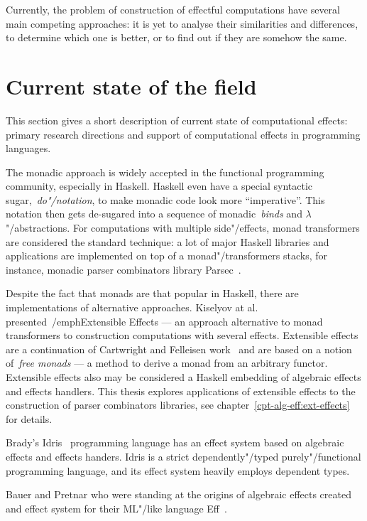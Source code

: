 Currently, the problem of construction of effectful computations have several
main competing approaches: it is yet to analyse their similarities and differences,
to determine which one is better, or to find out if they are somehow the same.

\section{Current state of the field}

This section gives a short description of current state of computational effects:
primary research directions and support of computational effects in programming
languages.

The monadic approach is widely accepted in the functional programming community,
especially in Haskell. Haskell even have a special syntactic sugar,~\emph{do"/notation}, to
make monadic code look more ``imperative''. This notation then gets de-sugared
into a sequence of monadic~\emph{binds} and $\lambda$"/abstractions. For computations
with multiple side"/effects, monad transformers are considered the standard technique:
a lot of major Haskell libraries and applications are implemented on top of a
monad"/transformers stacks, for instance, monadic parser combinators library
Parsec~\cite{parsec}.

Despite the fact that monads are that popular in Haskell, there are implementations
of alternative approaches. Kiselyov at al. presented~/emph{Extensible Effects} ---
an approach alternative to monad transformers to construction computations with
several effects. Extensible effects are a continuation of Cartwright and Felleisen
work~\cite{Cartwright1994} and are based on a notion of~\emph{free monads} --- a
method to derive a monad from an arbitrary functor. Extensible effects also may be
considered a Haskell embedding of algebraic effects and effects handlers. This thesis
explores applications of extensible effects to the construction of parser combinators
libraries, see chapter~\ref{cpt-alg-eff:ext-effects} for details.

Brady's Idris~\cite{DBLP:conf/lfmtp/Brady14} programming language has an effect
system based on algebraic effects and effects handers. Idris is a strict
dependently"/typed purely"/functional programming language, and its effect system
heavily employs dependent types.

Bauer and Pretnar who were standing at the origins of algebraic effects created
and effect system for their ML"/like language Eff~\cite{DBLP:journals/corr/BauerP13}.

